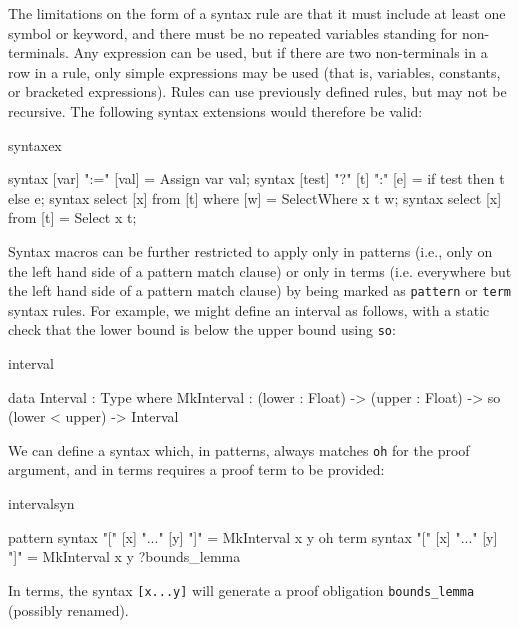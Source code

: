 \noindent
The limitations on the form of a syntax rule are that it must include at least
one symbol or keyword, and there must be no repeated variables standing for
non-terminals. Any expression can be used, but if there are two non-terminals
in a row in a rule, only simple expressions may be used (that is, variables,
constants, or bracketed expressions). Rules can use previously defined rules,
but may not be recursive.  The following syntax extensions would therefore be
valid:

\begin{SaveVerbatim}{syntaxex}

syntax [var] ":=" [val]              = Assign var val;
syntax [test] "?" [t] ":" [e]        = if test then t else e;
syntax select [x] from [t] where [w] = SelectWhere x t w;
syntax select [x] from [t]           = Select x t;

\end{SaveVerbatim}

\noindent
Syntax macros can be further restricted to apply only in patterns (i.e., only on the left
hand side of a pattern match clause) or only in terms (i.e. everywhere but the left hand side
of a pattern match clause) by being marked as \texttt{pattern} or \texttt{term} syntax
rules. For example, we might define an interval as follows, with a static check
that the lower bound is below the upper bound using \texttt{so}:

\begin{SaveVerbatim}{interval}

data Interval : Type where
   MkInterval : (lower : Float) -> (upper : Float) -> 
                so (lower < upper) -> Interval

\end{SaveVerbatim}

\noindent
We can define a syntax which, in patterns, always matches \texttt{oh} for the proof 
argument, and in terms requires a proof term to be provided:

\begin{SaveVerbatim}{intervalsyn}

pattern syntax "[" [x] "..." [y] "]" = MkInterval x y oh
term    syntax "[" [x] "..." [y] "]" = MkInterval x y ?bounds_lemma

\end{SaveVerbatim}

\noindent
In terms, the syntax \texttt{[x...y]} will generate a proof obligation
\texttt{bounds\_lemma} (possibly renamed).

